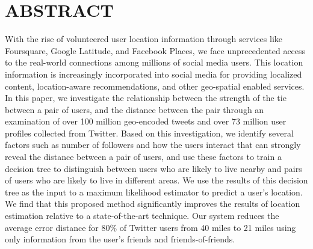 %
%
%

\chapter*{ABSTRACT}

\pagestyle{plain} %
\setcounter{page}{2}


\indent With the rise of volunteered user location information through services
like Foursquare, Google Latitude, and Facebook Places, we face unprecedented
access to the real-world connections among millions of social media users.
%
This location information is increasingly incorporated into social media for
providing localized content, location-aware recommendations, and other
geo-spatial enabled services.
%
In this paper, we investigate the relationship between the strength of the tie
between a pair of users, and the distance between the pair through an
examination of over 100 million geo-encoded tweets and
over 73 million user profiles collected from  Twitter.
%
Based on this investigation, we identify several factors such as number of
followers and how the users interact that can strongly reveal the distance
between a pair of users, and use these factors to train a decision tree to
distinguish between users who are likely to live nearby and pairs of users who
are likely to live in different areas.
%
We use the results of this decision tree as the input to a maximum likelihood
estimator to predict a user's location.
%
We find that this proposed method significantly improves the results of
location estimation relative to a state-of-the-art technique.
%
Our system reduces the average error distance for 80\% of Twitter users from 40
miles to 21 miles using only information from the user's friends and
friends-of-friends.

\pagebreak{}
